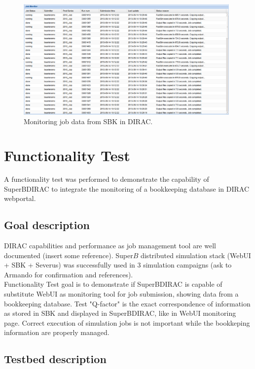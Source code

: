 \documentclass[a4paper]{jpconf}
\begin{document}
\begin{figure}[h]
\includegraphics[width=26pc]{img/SuperBDIRAC_monitoring.eps}\hspace{2pc}%
\caption{\label{fig:superbdirac_monitoring}Monitoring job data from SBK in DIRAC.}
\end{figure}

\section{Functionality Test}
\label{sec:test}
A functionality test was performed to demonstrate the capability of SuperBDIRAC to integrate the monitoring of a bookkeeping database in DIRAC webportal.
\subsection{Goal description}
DIRAC capabilities and performance as job management tool are well documented (insert some reference). Super$B$ distributed simulation stack (WebUI + SBK + Severus) was successfully used in 3 simulation campaigns (ask to Armando for confirmation and references).\\
Functionality Test goal is to demonstrate if SuperBDIRAC is capable of substitute WebUI as monitoring tool for job submission, showing data from a bookkeeping database. Test "Q-factor" is the exact correspondence of information as stored in SBK and displayed in SuperBDIRAC, like in WebUI monitoring page. Correct execution of simulation jobs is not important while the bookkeping information are properly managed.

\subsection{Testbed description}
\end{document}
